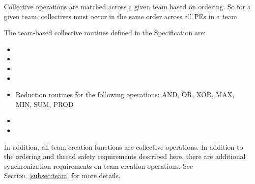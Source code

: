 Collective operations are matched across a given team based on ordering. So for a given team,
collectives must occur in the same order across all PEs in a team.

The team-based collective routines defined in the \openshmem Specification are:

\begin{itemize}
\item {}
\item {}
\item {}
\item {}
\item Reduction routines for the following operations: AND, OR, XOR, MAX, MIN, SUM, PROD
\item {}
\item {}
\end{itemize}

In addition, all team creation functions are collective operations. In addition to the ordering
and thread safety requirements described here, there are additional synchronization requirements
on team creation operations. See Section~\ref{subsec:team} for more details.

